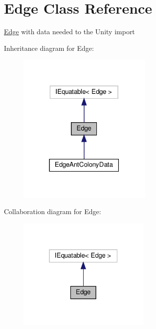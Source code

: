 \hypertarget{classEdge}{}\section{Edge Class Reference}
\label{classEdge}


\hyperlink{classEdge}{Edge} with data needed to the Unity import  




Inheritance diagram for Edge\+:\nopagebreak
\begin{figure}[H]
\begin{center}
\leavevmode
\includegraphics[width=186pt]{classEdge__inherit__graph}
\end{center}
\end{figure}


Collaboration diagram for Edge\+:\nopagebreak
\begin{figure}[H]
\begin{center}
\leavevmode
\includegraphics[width=184pt]{classEdge__coll__graph}
\end{center}
\end{figure}
